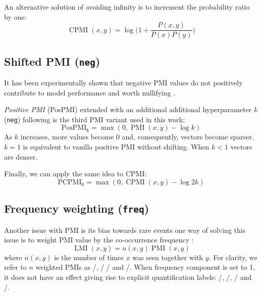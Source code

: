 \documentclass[11pt,letterpaper]{article}
\begin{document}
An alternative solution of avoiding infinity is to increment the probability ratio by one:
%
\begin{equation}
  \label{eq:cpmi}
  \operatorname{CPMI}(x, y) = \log\Big( 1 + \frac{P(x,y)}{P(x)P(y)} \Big)
\end{equation}

\subsection{Shifted PMI (\texttt{neg})}
\label{sec:shifted-pmi}



It has been experimentally shown that negative PMI values do not positively contribute to model performance and worth nullifying \cite{Turney:2010:FMV:1861751.1861756}.

\emph{Positive PMI} (PosPMI) extended with an additional additional hyperparameter $k$ (\texttt{neg}) following  is the third PMI variant used in this work:
%
\begin{equation}
  \label{eq:ppmi}
  \operatorname{PosPMI_k} = \max (0, \operatorname{PMI}(x, y) - \log k)
\end{equation}
%
As $k$ increases, more values become 0 and, consequently, vectors become sparser. $k = 1$ is equivalent to vanilla positive PMI without shifting. When $k < 1$ vectors are denser.

Finally, we can apply the same idea to CPMI:
%
\begin{equation}
  \label{eq:pcpmi}
  \operatorname{PCPMI_k} = \max (0, \operatorname{CPMI}(x, y) - \log 2k)
\end{equation}

\subsection{Frequency weighting (\texttt{freq})}
\label{sec:frequency-weighting}

Another issue with PMI is its bias towards rare events \cite{TACL570} one way of solving this issue is to weight PMI value by the co-occurrence frequency \cite{Evert05}:
%
\begin{equation}
  \label{eq:lmi}
  \operatorname{LMI}(x, y) = n(x, y)\operatorname{PMI}(x, y)
\end{equation}
%
where $n(x, y)$ is the number of times $x$ was seen together with $y$. For clarity, we refer to $n$ weighted PMIs as \NPMI/, \NPPMI/ \NCPMI/ and \NPCPMI/. When frequency component is set to 1, it does not have an effect giving rise to explicit quantification labels: \PMI/, \PPMI/, \CPMI/ and \PCPMI/.
\end{document}
